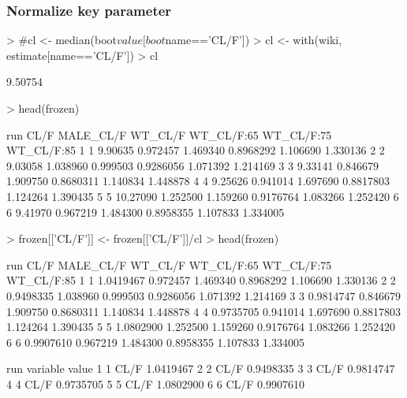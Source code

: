 \subsubsection{Normalize key parameter}
\begin{Schunk}
\begin{Sinput}
> #cl <- median(boot$value[boot$name=='CL/F'])
> cl <- with(wiki, estimate[name=='CL/F'])
> cl
\end{Sinput}
\begin{Soutput}
[1] 9.50754
\end{Soutput}
\begin{Sinput}
> head(frozen)
\end{Sinput}
\begin{Soutput}
  run     CL/F MALE_CL/F  WT_CL/F WT_CL/F:65 WT_CL/F:75 WT_CL/F:85
1   1  9.90635  0.972457 1.469340  0.8968292   1.106690   1.330136
2   2  9.03058  1.038960 0.999503  0.9286056   1.071392   1.214169
3   3  9.33141  0.846679 1.909750  0.8680311   1.140834   1.448878
4   4  9.25626  0.941014 1.697690  0.8817803   1.124264   1.390435
5   5 10.27090  1.252500 1.159260  0.9176764   1.083266   1.252420
6   6  9.41970  0.967219 1.484300  0.8958355   1.107833   1.334005
\end{Soutput}
\begin{Sinput}
> frozen[['CL/F']] <- frozen[['CL/F']]/cl
> head(frozen)
\end{Sinput}
\begin{Soutput}
  run      CL/F MALE_CL/F  WT_CL/F WT_CL/F:65 WT_CL/F:75 WT_CL/F:85
1   1 1.0419467  0.972457 1.469340  0.8968292   1.106690   1.330136
2   2 0.9498335  1.038960 0.999503  0.9286056   1.071392   1.214169
3   3 0.9814747  0.846679 1.909750  0.8680311   1.140834   1.448878
4   4 0.9735705  0.941014 1.697690  0.8817803   1.124264   1.390435
5   5 1.0802900  1.252500 1.159260  0.9176764   1.083266   1.252420
6   6 0.9907610  0.967219 1.484300  0.8958355   1.107833   1.334005
\end{Soutput}
\begin{Soutput}
  run variable     value
1   1     CL/F 1.0419467
2   2     CL/F 0.9498335
3   3     CL/F 0.9814747
4   4     CL/F 0.9735705
5   5     CL/F 1.0802900
6   6     CL/F 0.9907610
\end{Soutput}
\end{Schunk}
